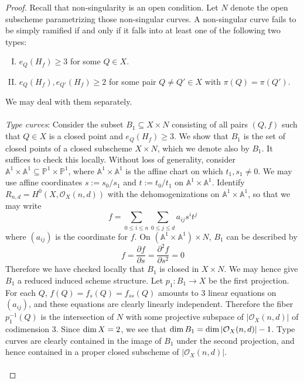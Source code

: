 \documentclass[12pt]{article}
\theoremstyle{plain}
\theoremstyle{definition}
\newcommand{\IA}{\mathbb{A}}
\newcommand{\IP}{\mathbb{P}}
\newcommand{\sO}{\mathcal{O}}
\renewcommand\dim{{\rm dim\,}}
\newcommand{\<}{\langle}
\renewcommand{\>}{\rangle}
\newcommand{\p}{\partial}
\begin{document}
\begin{proof}
Recall that non-singularity is an open condition. Let $N$ denote the open subscheme parametrizing those non-singular curves. A non-singular curve fails to be simply ramified if and only if it falls into at least one of the following two types: 

\begin{enumerate}[I.]
\item $e_Q(H_f) \ge 3$ for some $Q \in X$. 
\item $e_{Q}(H_f), e_{Q'}(H_f) \ge 2$ for some pair $Q \neq Q' \in X$ with $\pi(Q) = \pi(Q')$. 
\end{enumerate}
We may deal with them separately. \\\\
\textit{Type \uppercase\expandafter{} curves}: Consider the subset $B_1 \subseteq X \times N$ consisting of all pairs $(Q, f)$ such that $Q \in X$ is a closed point and $e_Q(H_f) \ge 3$. We show that $B_1$ is the set of closed points of a closed subscheme $X \times N$, which we denote also by $B_1$. It suffices to check this locally. Without loss of generality, consider $\IA^1 \times \IA^1 \subseteq \IP^1 \times \IP^1$, where $\IA^1 \times \IA^1$ is the affine chart on which $t_1, s_1 \neq 0$. We may use affine coordinates $s := s_0/s_1$ and $t := t_0/t_1$ on $\IA^1 \times \IA^1$. Identify $R_{n, d} = H^0(X, \sO_X(n, d))$ with the dehomogenizations on $\IA^1 \times \IA^1$, so that we may write 
\begin{equation} \label{ident} f = \sum_{0 \le i \le n} \sum_{0 \le j \le d} a_{ij} s^i t^j \end{equation}
where $(a_{ij})$ is the coordinate for $f$. On $(\IA^1 \times \IA^1) \times N$, $B_1$ can be described by 
\begin{equation} f = \frac{\p f}{\p s} = \frac{\p^2 f}{\p s^2} = 0 \end{equation}
Therefore we have checked locally that $B_1$ is closed in $X \times N$. We may hence give $B_1$ a reduced induced scheme structure. Let $p_1 : B_1 \to X$ be the first projection. For each $Q$, $f(Q) = f_s(Q) = f_{ss}(Q)$ amounts to 3 linear equations on $(a_{ij})$, and these equations are clearly linearly independent. Therefore the fiber $p_1^{-1}(Q)$ is the intersection of $N$ with some projective subspace of $|\sO_X(n, d)|$ of codimension $3$. Since $\dim X = 2$, we see that $\dim B_1 = \dim |\sO_X(n, d)| - 1$. Type \uppercase\expandafter{} curves are clearly contained in the image of $B_1$ under the second projection, and hence contained in a proper closed subscheme of $|\sO_X(n, d)|$. \\\\

\end{proof}
\end{document}
